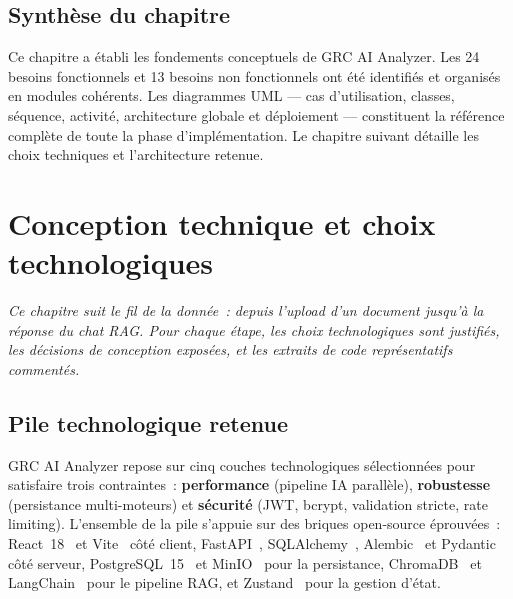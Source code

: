 \documentclass[a4paper,12pt,oneside]{report}
\begin{document}
	\section{Synth\`ese du chapitre}
	
	Ce chapitre a \'etabli les fondements conceptuels de GRC AI Analyzer. Les 24 besoins fonctionnels et 13 besoins non fonctionnels ont \'et\'e identifi\'es et organis\'es en modules coh\'erents. Les diagrammes UML --- cas d'utilisation, classes, s\'equence, activit\'e, architecture globale et d\'eploiement --- constituent la r\'ef\'erence compl\`ete de toute la phase d'impl\'ementation. Le chapitre suivant d\'etaille les choix techniques et l'architecture retenue.
	
	\chapter{Conception technique et choix technologiques}
	
	\begin{tcolorbox}[infobox]
		\itshape Ce chapitre suit le fil de la donn\'ee~: depuis l'upload d'un
		document jusqu'\`a la r\'eponse du chat RAG. Pour chaque \'etape,
		les choix technologiques sont justifi\'es, les d\'ecisions de conception
		expos\'ees, et les extraits de code repr\'esentatifs comment\'es.
	\end{tcolorbox}
	
	\section{Pile technologique retenue}
	
	
	GRC AI Analyzer repose sur cinq couches technologiques s\'electionn\'ees
	pour satisfaire trois contraintes~: \textbf{performance} (pipeline IA
	parall\`ele), \textbf{robustesse} (persistance multi-moteurs) et
	\textbf{s\'ecurit\'e} (JWT, bcrypt, validation stricte, rate limiting).
	L'ensemble de la pile s'appuie sur des briques open-source \'eprouv\'ees~:
	React~18~\cite{react18} et Vite~\cite{vite} c\^ot\'e client, FastAPI~\cite{fastapi},
	SQLAlchemy~\cite{sqlalchemy}, Alembic~\cite{alembic} et Pydantic~\cite{pydantic}
	c\^ot\'e serveur, PostgreSQL~15~\cite{postgresql} et MinIO~\cite{minio} pour la
	persistance, ChromaDB~\cite{chromadb} et LangChain~\cite{langchain_rag} pour le
	pipeline RAG, et Zustand~\cite{zustand} pour la gestion d'\'etat.
	
\end{document}
